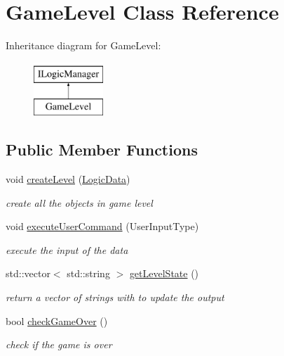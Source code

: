 \hypertarget{class_game_level}{}\section{Game\+Level Class Reference}
\label{class_game_level}
Inheritance diagram for Game\+Level\+:\begin{figure}[H]
\begin{center}
\leavevmode
\includegraphics[height=2.000000cm]{class_game_level}
\end{center}
\end{figure}
\subsection*{Public Member Functions}
\begin{DoxyCompactItemize}
\item 
\mbox{\label{class_game_level_a4e520fb697c9f7f62daf02b37c31123c}} 
void \mbox{\hyperlink{class_game_level_a4e520fb697c9f7f62daf02b37c31123c}{create\+Level}} (\mbox{\hyperlink{class_logic_data}{Logic\+Data}})
\begin{DoxyCompactList}\small\item\em create all the objects in game level \end{DoxyCompactList}\item 
\mbox{\label{class_game_level_a53cd899aa9aeaf3e9579ff32598b0043}} 
void \mbox{\hyperlink{class_game_level_a53cd899aa9aeaf3e9579ff32598b0043}{execute\+User\+Command}} (User\+Input\+Type)
\begin{DoxyCompactList}\small\item\em execute the input of the data \end{DoxyCompactList}\item 
\mbox{\label{class_game_level_a057f1b02b0706b60980559badaba4cbf}} 
std\+::vector$<$ std\+::string $>$ \mbox{\hyperlink{class_game_level_a057f1b02b0706b60980559badaba4cbf}{get\+Level\+State}} ()
\begin{DoxyCompactList}\small\item\em return a vector of strings with to update the output \end{DoxyCompactList}\item 
\mbox{\label{class_game_level_a5abb06b252b4593608aae90dac77d7cd}} 
bool \mbox{\hyperlink{class_game_level_a5abb06b252b4593608aae90dac77d7cd}{check\+Game\+Over}} ()
\begin{DoxyCompactList}\small\item\em check if the game is over \end{DoxyCompactList}\end{DoxyCompactItemize}


